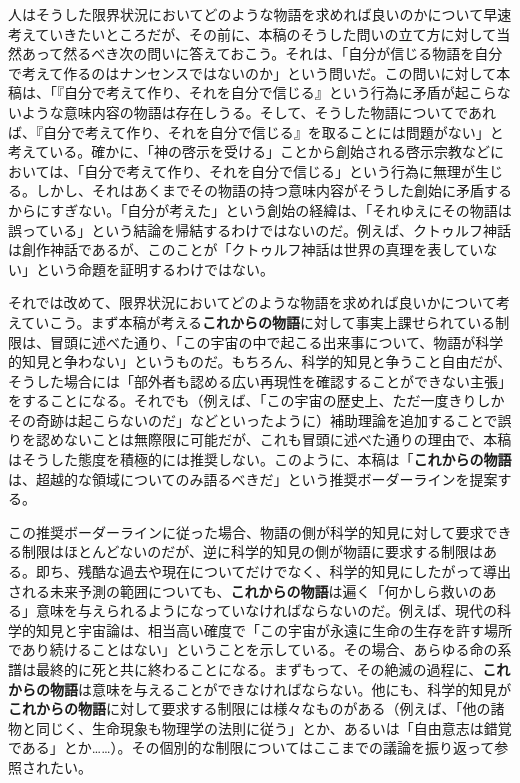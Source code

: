 人はそうした限界状況においてどのような物語を求めれば良いのかについて早速考えていきたいところだが、その前に、本稿のそうした問いの立て方に対して当然あって然るべき次の問いに答えておこう。それは、「自分が信じる物語を自分で考えて作るのはナンセンスではないのか」という問いだ。この問いに対して本稿は、「『自分で考えて作り、それを自分で信じる』という行為に矛盾が起こらないような意味内容の物語は存在しうる。そして、そうした物語についてであれば、『自分で考えて作り、それを自分で信じる』を取ることには問題がない」と考えている。確かに、「神の啓示を受ける」ことから創始される啓示宗教などにおいては、「自分で考えて作り、それを自分で信じる」という行為に無理が生じる。しかし、それはあくまでその物語の持つ意味内容がそうした創始に矛盾するからにすぎない。「自分が考えた」という創始の経緯は、「それゆえにその物語は誤っている」という結論を帰結するわけではないのだ。例えば、クトゥルフ神話は創作神話であるが、このことが「クトゥルフ神話は世界の真理を表していない」という命題を証明するわけではない。

それでは改めて、限界状況においてどのような物語を求めれば良いかについて考えていこう。まず本稿が考える\textbf{これからの物語}に対して事実上課せられている制限は、冒頭に述べた通り、「この宇宙の中で起こる出来事について、物語が科学的知見と争わない」というものだ。もちろん、科学的知見と争うこと自由だが、そうした場合には「部外者も認める広い再現性を確認することができない主張」をすることになる。それでも（例えば、「この宇宙の歴史上、ただ一度きりしかその奇跡は起こらないのだ」などといったように）補助理論を追加することで誤りを認めないことは無際限に可能だが、これも冒頭に述べた通りの理由で、本稿はそうした態度を積極的には推奨しない。このように、本稿は「\textbf{これからの物語}は、超越的な領域についてのみ語るべきだ」という推奨ボーダーラインを提案する。

この推奨ボーダーラインに従った場合、物語の側が科学的知見に対して要求できる制限はほとんどないのだが、逆に科学的知見の側が物語に要求する制限はある。即ち、残酷な過去や現在についてだけでなく、科学的知見にしたがって導出される未来予測の範囲についても、\textbf{これからの物語}は遍く「何かしら救いのある」意味を与えられるようになっていなければならないのだ。例えば、現代の科学的知見と宇宙論は、相当高い確度で「この宇宙が永遠に生命の生存を許す場所であり続けることはない」ということを示している。その場合、あらゆる命の系譜は最終的に死と共に終わることになる。まずもって、その絶滅の過程に、\textbf{これからの物語}は意味を与えることができなければならない。他にも、科学的知見が\textbf{これからの物語}に対して要求する制限には様々なものがある（例えば、「他の諸物と同じく、生命現象も物理学の法則に従う」とか、あるいは「自由意志は錯覚である」とか\ldots\ldots）。その個別的な制限についてはここまでの議論を振り返って参照されたい。

